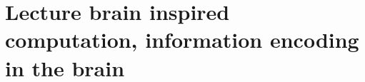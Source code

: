 \section{ Lecture brain inspired computation, information encoding in the brain }\label{sec:q1}    
